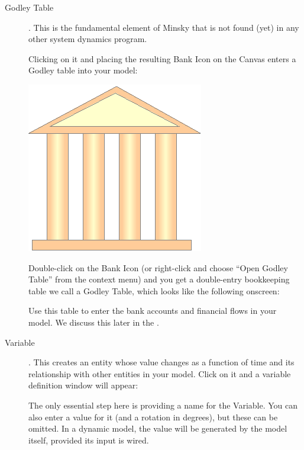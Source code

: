\begin{description}
\item[Godley Table] . \label{GodleyTable} This is the
fundamental element of Minsky that is not found (yet) in any other
system dynamics program. 

Clicking on it and placing the resulting Bank Icon on the Canvas
enters a Godley table into your model:

\begin{center}
\includegraphics{images/NewItem29.eps}
\end{center}

Double-click on the Bank Icon (or right-click and choose ``Open Godley
Table'' from the context menu) and you get a double-entry bookkeeping
table we call a Godley Table, which looks like the following onscreen:


 
Use this table to enter the bank accounts and financial flows in your model. We discuss this later in the .

\item[Variable]  . \label{Variable} This creates an entity
whose value changes as a function of time and its relationship with
other entities in your model. Click on it and a variable definition
window will appear:

\begin{center}
\end{center}

The only essential step here is providing a name for the Variable. You
can also enter a value for it (and a rotation in degrees), but these
can be omitted. In a dynamic model, the value will be generated by the
model itself, provided its input is wired.



\end{description}
